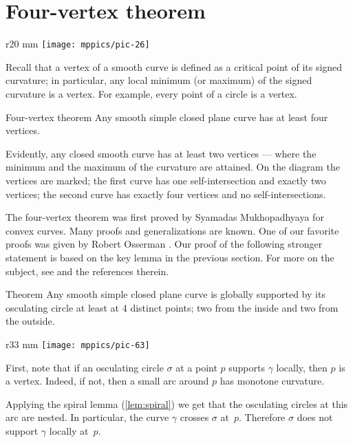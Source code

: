 \section{Four-vertex theorem}
{

\begin{wrapfigure}{r}{20 mm}
\vskip-8mm
\centering
\texttt{[image: mppics/pic-26]}
\vskip0mm
\end{wrapfigure}

Recall that a vertex of a smooth curve is defined as a critical point of its signed curvature;
in particular, any local minimum (or maximum) of the signed curvature is a vertex.
For example, every point of a circle is a vertex.

\begin{thm}{Four-vertex theorem}\label{thm:4-vert}
Any smooth simple closed plane curve has at least four vertices.
\end{thm}

}

Evidently, any closed smooth curve has at least two vertices --- where the minimum and the maximum of the curvature are attained.
On the diagram the vertices are marked;
the first curve has one self-intersection and exactly two vertices;
the second curve has exactly four vertices and no self-intersections.

The four-vertex theorem was first proved by Syamadas Mukhopadhyaya \cite{mukhopadhyaya} for convex curves.
Many proofs and generalizations are known.
One of our favorite proofs was given by Robert Osserman \cite{osserman}.
Our proof of the following stronger statement is based on the key lemma in the previous section.
For more on the subject, see \cite{petrunin-zamora:moon} and the references therein.

\begin{thm}{Theorem}\label{thm:4-vert-supporting}
Any smooth simple closed plane curve is globally supported by its osculating circle at least at 4 distinct points;
two from the inside and two from the outside.
\end{thm}

{

\begin{wrapfigure}[8]{r}{33 mm}
\vskip-0mm
\centering
\texttt{[image: mppics/pic-63]}
\vskip0mm
\end{wrapfigure}

First, note that if an osculating circle $\sigma$ at a point $p$ supports $\gamma$ locally, then $p$ is a vertex.
Indeed, if not, then a small arc around $p$ has monotone curvature.


Applying the spiral lemma (\ref{lem:spiral}) we get that the osculating circles at this arc are nested.
In particular, the curve $\gamma$ crosses $\sigma$ at~$p$. 
Therefore $\sigma$ does not support $\gamma$ locally at~$p$.
\qeds


}


